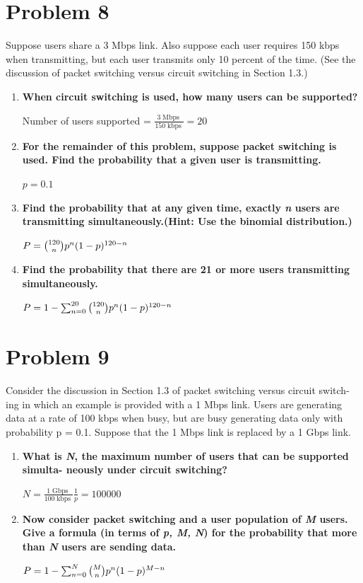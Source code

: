 \documentclass[11pt]{article}
\newenvironment{qparts}{\begin{enumerate}[{(}a{)}]}{\end{enumerate}}
\begin{document}
\newpage
\section{Problem 8}

Suppose users share a 3 Mbps link. Also suppose each user requires 150 kbps when transmitting, but each user transmits only 10 percent of the time. (See the discussion of packet switching versus circuit switching in Section 1.3.)

\begin{qparts}
	\item \textbf{When circuit switching is used, how many users can be supported?}
	
	Number of users supported = $\frac{3 \operatorname{Mbps}}{150 \operatorname{kbps}} = 20$

	\item  \textbf{For the remainder of this problem, suppose packet switching is used. Find the probability that a given user is transmitting.}
	
	$p = 0.1$
	
	\item  \textbf{Find the probability that at any given time, exactly \textit{n} users are transmitting simultaneously.(Hint: Use the binomial distribution.)}
	
	$P = \tbinom{120}{n}p^{n}(1-p)^{120-n}$
	
	\item  \textbf{Find the probability that there are 21 or more users transmitting simultaneously.}
	
	$P = 1 - \sum_{n=0}^{20} \tbinom{120}{n}p^{n}(1-p)^{120-n}$

\end{qparts}

\newpage
\section{Problem 9}

Consider the discussion in Section 1.3 of packet switching versus circuit switch- ing in which an example is provided with a 1 Mbps link. Users are generating data at a rate of 100 kbps when busy, but are busy generating data only with probability p = 0.1. Suppose that the 1 Mbps link is replaced by a 1 Gbps link.

\begin{qparts}
	\item \textbf{What is \textit{N}, the maximum number of users that can be supported simulta- neously under circuit switching?}
	
	$N = \frac{1 \operatorname{Gbps}}{100 \operatorname{kbps}} \frac{1}{p} = 100000$
	
	\item \textbf{Now consider packet switching and a user population of \textit{M} users. Give a formula (in terms of \textit{p, M, N}) for the probability that more than \textit{N} users are sending data.}
	
	$P = 1 - \sum_{n=0}^{N} \tbinom{M}{n}p^{n}(1-p)^{M-n}$

\end{qparts}
\end{document}
